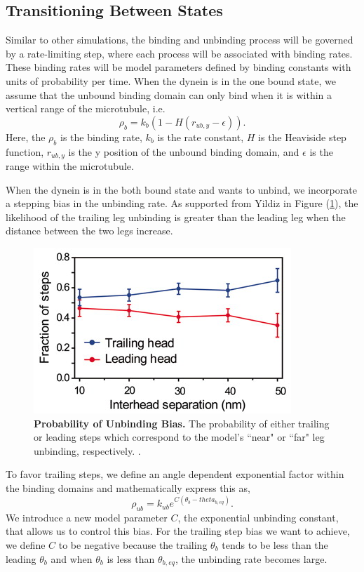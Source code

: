 \subsection{Transitioning Between States}

Similar to other simulations, the binding and unbinding process will be governed by a rate-limiting step, where each process will be associated with binding rates. These binding rates will be model parameters defined by binding constants with units of probability per time. When the dynein is in the one bound state, we assume that the unbound binding domain can only bind when it is within a vertical range of the microtubule, i.e.
\begin{equation}
	\rho_b=k_b(1-H(r_{ub,y}-\epsilon)).
\end{equation} 
Here, the $\rho_b$ is the binding rate, $k_b$ is the rate constant, $H$ is the Heaviside step function, $r_{ub,y}$ is the y position of the unbound binding domain, and $\epsilon$ is the range within the microtubule.

When the dynein is in the both bound state and wants to unbind, we incorporate a stepping bias in the unbinding rate. As supported from Yildiz in Figure (\ref{fig:trailingbias}), the likelihood of the trailing leg unbinding is greater than the leading leg when the distance between the two legs increase. 


\begin{figure}[H]
	\centering
	\includegraphics[width=0.6\columnwidth]{Figures/trailingbias.png}
	\caption[Probability of Unbinding Bias]{\textbf{Probability of Unbinding Bias.} The probability of either trailing or leading steps which correspond to the model's ``near" or ``far" leg unbinding, respectively. \cite{Dewitt2012}.}
	\label{fig:trailingbias}
\end{figure}

To favor trailing steps, we define an angle dependent exponential factor within the binding domains and mathematically express this as,
\begin{equation}
	\rho_{ub}=k_{ub}e^{C(\theta_b-theta_{b,eq})}.
\end{equation}
We introduce a new model parameter $C$, the exponential unbinding constant, that allows us to control this bias. For the trailing step bias we want to achieve, we define $C$ to be negative because the trailing $\theta_b$ tends to be less than the leading $\theta_b$ and  when $\theta_b$ is less than $\theta_{b,eq}$, the unbinding rate becomes large.


